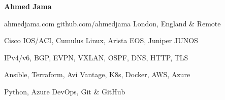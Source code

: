 \documentclass[11pt]{article} %
\begin{document}
\centerline{{\Huge \bf Ahmed Jama}}

\bigskip

        {ahmedjama.com}
        {github.com/ahmedjama}
        {London, England \& Remote}


      {Cisco IOS/ACI, Cumulus Linux, Arista EOS, Juniper JUNOS}
      
      {IPv4/v6, BGP, EVPN, VXLAN, OSPF, DNS, HTTP, TLS}

      {Ansible, Terraform, Avi Vantage, K8s, Docker, AWS, Azure}

      {Python, Azure DevOps, Git \& GitHub}



\end{document}

